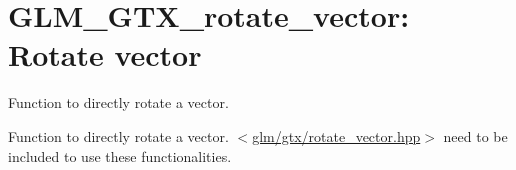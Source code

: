\hypertarget{group__gtx__rotate__vector}{\section{\-G\-L\-M\-\_\-\-G\-T\-X\-\_\-rotate\-\_\-vector\-: \-Rotate vector}
\label{group__gtx__rotate__vector}
}


\-Function to directly rotate a vector.  


\-Function to directly rotate a vector. $<$\hyperlink{rotate__vector_8hpp}{glm/gtx/rotate\-\_\-vector.\-hpp}$>$ need to be included to use these functionalities. 